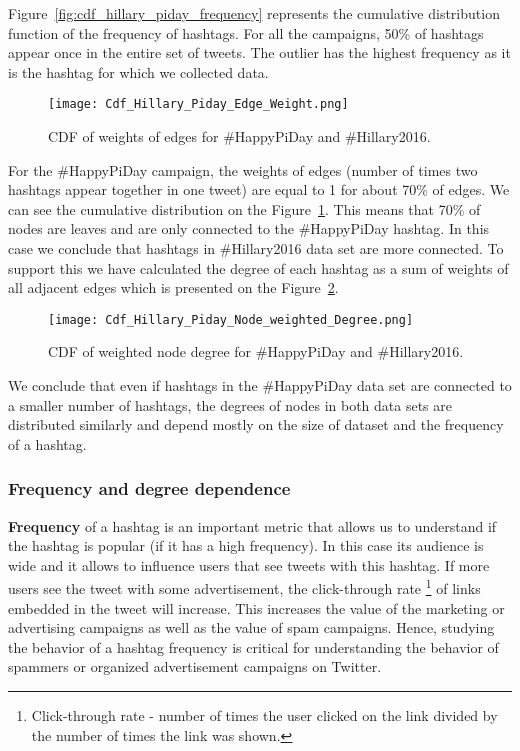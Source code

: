 \documentclass[journal, a4paper, 12pt]{article}
\begin{document}
Figure~\ref{fig:cdf_hillary_piday_frequency} represents the cumulative distribution function of the frequency of hashtags. For all the campaigns, 50\% of hashtags appear once in the entire set of tweets. The outlier has the highest frequency as it is the hashtag for which we collected data. \\

    	\begin{figure}[!hbt]
		\begin{center}
		\texttt{[image: Cdf\_Hillary\_Piday\_Edge\_Weight.png]}
		\caption{CDF of weights of edges for \#HappyPiDay and \#Hillary2016.}
		\label{fig:cdf_hillary_piday_edge_weight}
		\end{center}
	\end{figure}
    
For the \#HappyPiDay campaign, the weights of edges (number of times two hashtags appear together in one tweet) are equal to 1 for about 70\% of edges. We can see the cumulative distribution on the Figure~\ref{fig:cdf_hillary_piday_edge_weight}. This means that 70\% of nodes are leaves and are only connected to the \#HappyPiDay hashtag. In this case we conclude that hashtags in \#Hillary2016 data set are more connected. To support this we have calculated the degree of each hashtag as a sum of weights of all adjacent edges which is presented on the Figure~\ref{fig:cdf_hillary_piday_weight_sum}.
\\
    
        \begin{figure}[!hbt]
		\begin{center}
		\texttt{[image: Cdf\_Hillary\_Piday\_Node\_weighted\_Degree.png]}
		\caption{CDF of weighted node degree for \#HappyPiDay and \#Hillary2016.}
		\label{fig:cdf_hillary_piday_weight_sum}
		\end{center}
	\end{figure}

We conclude that even if hashtags in the \#HappyPiDay data set are connected to a smaller number of hashtags, the degrees of nodes in both data sets are distributed similarly and depend mostly on the size of dataset and the frequency of a hashtag. \\

\subsubsection{Frequency and degree dependence}
\textbf{Frequency} of a hashtag is an important metric that allows us to understand if the hashtag is popular (if it has a high frequency). In this case its audience is wide and it allows to influence users that see tweets with this hashtag. If more users see the tweet with some advertisement, the click-through rate \footnote{Click-through rate - number of times the user clicked on the link divided by the number of times the link was shown.} of links embedded in the tweet will increase. This increases the value of the marketing or advertising campaigns as well as the value of spam campaigns. Hence, studying the behavior of a hashtag frequency is critical for understanding the behavior of spammers or organized advertisement campaigns on Twitter.\\
\end{document}
